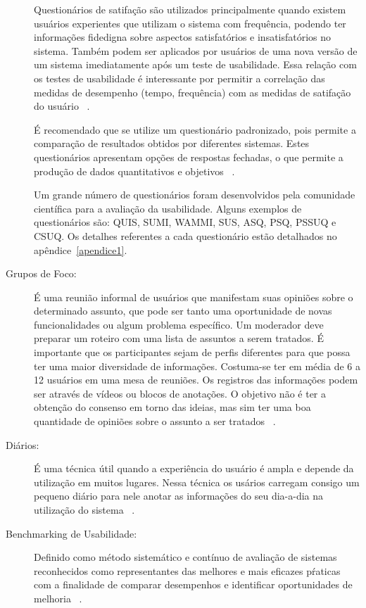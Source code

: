 \begin{description}
	Questionários de satifação são utilizados principalmente quando existem usuários experientes que utilizam o sistema com frequência, podendo ter informações fidedigna sobre aspectos satisfatórios e insatisfatórios no sistema. Também podem ser aplicados por usuários de uma nova versão de um sistema imediatamente após um teste de usabilidade. Essa relação com os testes de usabilidade é interessante por permitir a correlação das medidas de desempenho (tempo, frequência) com as medidas de satifação do usuário ~\cite{cybis2010}.

	É recomendado que se utilize um questionário padronizado, pois permite a comparação de resultados obtidos por diferentes sistemas. Estes questionários apresentam opções de respostas fechadas, o que permite a produção de dados quantitativos e objetivos ~\cite{cybis2010}.

	Um grande número de questionários foram desenvolvidos pela comunidade científica para a avaliação da usabilidade.  Alguns exemplos de questionários são: QUIS, SUMI,  WAMMI, SUS, ASQ, PSQ, PSSUQ e CSUQ. Os detalhes referentes a cada questionário estão detalhados no apêndice~\ref{apendice1}.

\item[Grupos de Foco:]

É uma reunião informal de usuários que manifestam suas opiniões sobre o determinado assunto, que pode ser tanto uma oportunidade de novas funcionalidades ou algum problema específico.
%
Um moderador deve preparar um roteiro  com uma lista de assuntos a serem tratados. É importante que os participantes sejam de perfis diferentes para que possa ter uma maior diversidade de informações. Costuma-se ter em média de 6 a 12 usuários em uma mesa de reuniões. Os registros das informações podem ser através de vídeos ou blocos de anotações. O objetivo não é ter a obtenção do consenso em torno das ideias, mas sim ter uma boa quantidade de opiniões sobre o assunto a ser tratados ~\cite{cybis2010}.


\item[Diários:]

	É uma técnica útil quando a experiência do usuário é ampla e depende da utilização em muitos lugares. Nessa técnica os usários carregam consigo um pequeno diário para nele anotar as informações do seu dia-a-dia na utilização do sistema ~\cite{cybis2010}.

\item[Benchmarking de Usabilidade:]

	Definido como método sistemático e contínuo de avaliação de sistemas reconhecidos como representantes das melhores e mais eficazes pŕaticas com a finalidade de comparar desempenhos e identificar oportunidades de melhoria ~\cite{spendolini1994}.


\end{description}
